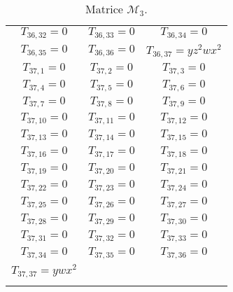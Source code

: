 \documentclass[12pt]{memoireuqam1.3}
\begin{document}
\begin{longtable}{|c|c|c|}
$T_{36,32}= 0$&

$T_{36,33}= 0$&

$T_{36,34}= 0$\\

$T_{36,35}= 0$&

$T_{36,36}= 0$&

$T_{36,37}= yz^2wx^2$\\

$T_{37,1}= 0$&

$T_{37,2}= 0$&

$T_{37,3}= 0$\\

$T_{37,4}= 0$&

$T_{37,5}= 0$&

$T_{37,6}= 0$\\

$T_{37,7}= 0$&

$T_{37,8}= 0$&

$T_{37,9}= 0$\\

$T_{37,10}= 0$&

$T_{37,11}= 0$&

$T_{37,12}= 0$\\

$T_{37,13}= 0$&

$T_{37,14}= 0$&

$T_{37,15}= 0$\\

$T_{37,16}= 0$&

$T_{37,17}= 0$&

$T_{37,18}= 0$\\

$T_{37,19}= 0$&

$T_{37,20}= 0$&

$T_{37,21}= 0$\\

$T_{37,22}= 0$&

$T_{37,23}= 0$&

$T_{37,24}= 0$\\

$T_{37,25}= 0$&

$T_{37,26}= 0$&

$T_{37,27}= 0$\\

$T_{37,28}= 0$&

$T_{37,29}= 0$&

$T_{37,30}= 0$\\

$T_{37,31}= 0$&

$T_{37,32}= 0$&

$T_{37,33}= 0$\\

$T_{37,34}= 0$&

$T_{37,35}= 0$&

$T_{37,36}= 0$\\

$T_{37,37}= ywx^2$& &\\
\hline
\caption{\label{tab7} Matrice $\mathcal{M}_{3}$.}
\end{longtable}
\end{document}
